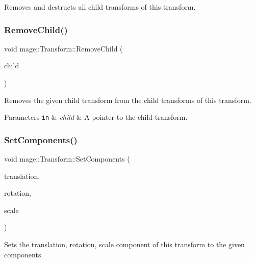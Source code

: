 Removes and destructs all child transforms of this transform. \hypertarget{structmage_1_1_transform_a387bb274fec0cc5ea8d6f3504536ad50}{}\label{structmage_1_1_transform_a387bb274fec0cc5ea8d6f3504536ad50} 
\subsubsection{\texorpdfstring{Remove\+Child()}{RemoveChild()}}
{\footnotesize\ttfamily void mage\+::\+Transform\+::\+Remove\+Child (\begin{DoxyParamCaption}\item[{\hyperlink{namespacemage_a1e01ae66713838a7a67d30e44c67703e}{Shared\+Ptr}$<$ \hyperlink{structmage_1_1_transform}{Transform} $>$}]{child }\end{DoxyParamCaption})}

Removes the given child transform from the child transforms of this transform.


\begin{DoxyParams}[1]{Parameters}
\mbox{\tt in}  & {\em child} & A pointer to the child transform. \\
\hline
\end{DoxyParams}
\hypertarget{structmage_1_1_transform_aba5311db1360a15aea4de33a060ab27e}{}\label{structmage_1_1_transform_aba5311db1360a15aea4de33a060ab27e} 
\subsubsection{\texorpdfstring{Set\+Components()}{SetComponents()}\hspace{0.1cm}{\footnotesize\ttfamily [1/2]}}
{\footnotesize\ttfamily void mage\+::\+Transform\+::\+Set\+Components (\begin{DoxyParamCaption}\item[{const X\+M\+F\+L\+O\+A\+T3 \&}]{translation,  }\item[{const X\+M\+F\+L\+O\+A\+T3 \&}]{rotation,  }\item[{const X\+M\+F\+L\+O\+A\+T3 \&}]{scale }\end{DoxyParamCaption})}

Sets the translation, rotation, scale component of this transform to the given components.


